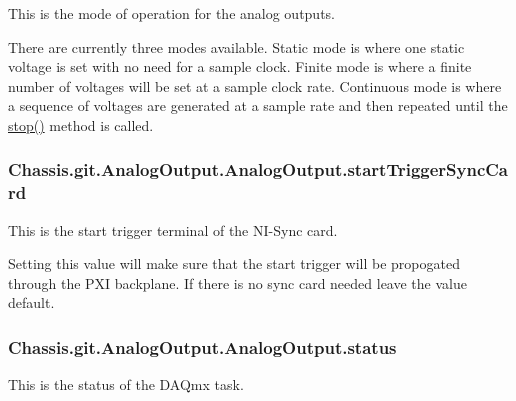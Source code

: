 This is the mode of operation for the analog outputs. 

There are currently three modes available. Static mode is where one static voltage is set with no need for a sample clock. Finite mode is where a finite number of voltages will be set at a sample clock rate. Continuous mode is where a sequence of voltages are generated at a sample rate and then repeated until the \hyperlink{class_chassis_8git_1_1_analog_output_1_1_analog_output_a0925cf3df53bab026bc23547f8a072b0}{stop()} method is called. \hypertarget{class_chassis_8git_1_1_analog_output_1_1_analog_output_adf297d1ff53368377985602e6a37faff}{
\subsubsection[{start\-Trigger\-Sync\-Card}]{\setlength{\rightskip}{0pt plus 5cm}Chassis.\-git.\-Analog\-Output.\-Analog\-Output.\-start\-Trigger\-Sync\-Card}}\label{class_chassis_8git_1_1_analog_output_1_1_analog_output_adf297d1ff53368377985602e6a37faff}


This is the start trigger terminal of the N\-I-\/\-Sync card. 

Setting this value will make sure that the start trigger will be propogated through the P\-X\-I backplane. If there is no sync card needed leave the value default. \hypertarget{class_chassis_8git_1_1_analog_output_1_1_analog_output_ae2a69d59152cb45ae0875a42ab203efd}{
\subsubsection[{status}]{\setlength{\rightskip}{0pt plus 5cm}Chassis.\-git.\-Analog\-Output.\-Analog\-Output.\-status}}\label{class_chassis_8git_1_1_analog_output_1_1_analog_output_ae2a69d59152cb45ae0875a42ab203efd}


This is the status of the D\-A\-Qmx task. 

